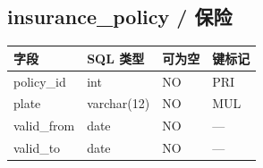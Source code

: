 \documentclass[11pt,a4paper]{article}
\begin{document}
\subsection*{insurance\_\allowbreak{}policy / 保险}
\par\begingroup\small\noindent
\begin{tabularx}{\linewidth}{p{4.4cm}p{4.0cm}p{1.5cm}X}
\toprule
字段 & SQL 类型 & 可为空 & 键标记\\\midrule
policy\_\allowbreak{}id & int & NO & PRI\\
plate & varchar(12) & NO & MUL\\
valid\_\allowbreak{}from & date & NO & —\\
valid\_\allowbreak{}to & date & NO & —\\
\bottomrule
\end{tabularx}
\par\endgroup
\end{document}
